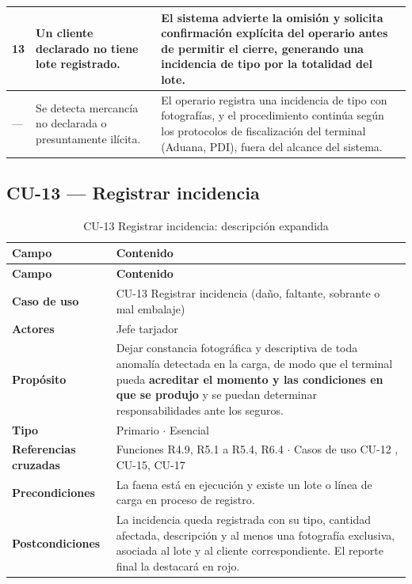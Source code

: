 {\begin{longtable}{C{0.06\textwidth} L{0.38\textwidth} L{0.48\textwidth}}
13 & Un cliente declarado no tiene lote registrado. &
El sistema advierte la omisión y solicita confirmación explícita del operario antes de permitir el
cierre, generando una incidencia de tipo  por la totalidad del lote. \\
\midrule

--- & Se detecta mercancía no declarada o presuntamente ilícita. &
El operario registra una incidencia de tipo  con fotografías, y el procedimiento
continúa según los protocolos de fiscalización del terminal (Aduana, PDI), fuera del alcance del
sistema. \\

\bottomrule

\end{longtable}
}

\subsection{CU-13 --- Registrar incidencia}
\label{subsec:cu13}

{\estilotabla
\begin{longtable}{L{0.25\textwidth} L{0.69\textwidth}}

\caption{CU-13 Registrar incidencia: descripción expandida}
\label{tab:cu13_desc}
\\

\toprule
\textbf{Campo} & \textbf{Contenido} \\
\midrule
\endfirsthead

\toprule
\textbf{Campo} & \textbf{Contenido} \\
\midrule
\endhead

\textbf{Caso de uso} & CU-13 Registrar incidencia (daño, faltante, sobrante o mal embalaje) \\
\midrule
\textbf{Actores} & Jefe tarjador  \\
\midrule
\textbf{Propósito} & Dejar constancia fotográfica y descriptiva de toda anomalía detectada en la
carga, de modo que el terminal pueda \textbf{acreditar el momento y las condiciones en que se
produjo} y se puedan determinar responsabilidades ante los seguros. \\
\midrule
\textbf{Tipo} & Primario $\cdot$ Esencial \\
\midrule
\textbf{Referencias cruzadas} & Funciones R4.9, R5.1 a R5.4, R6.4 $\cdot$ Casos de uso CU-12
, CU-15, CU-17 \\
\midrule
\textbf{Precondiciones} & La faena está en ejecución y existe un lote o línea de carga en proceso
de registro. \\
\midrule
\textbf{Postcondiciones} & La incidencia queda registrada con su tipo, cantidad afectada,
descripción y al menos una fotografía exclusiva, asociada al lote y al cliente correspondiente. El
reporte final la destacará en rojo. \\

\bottomrule

\end{longtable}
}

